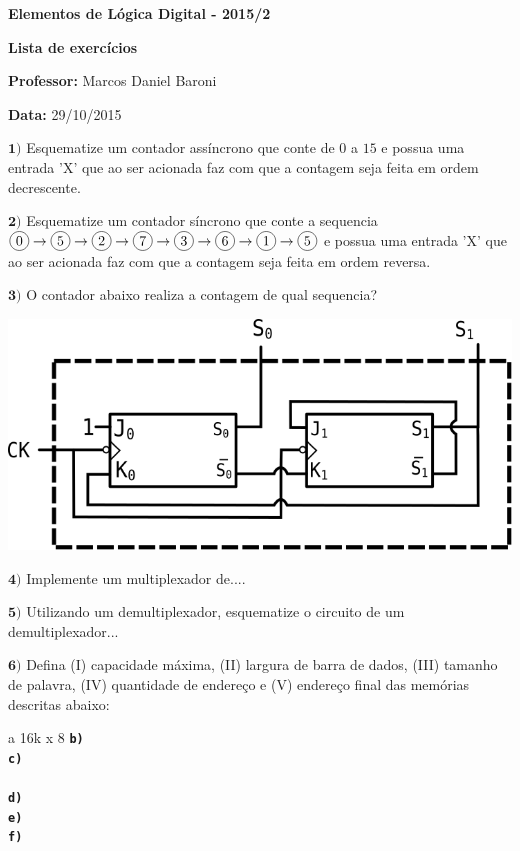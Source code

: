 \documentclass[12pt]{article}
\newcommand{\exerc}[3]{ \vspace*{25pt} {$\mathbf{#1)}$} #2 \hfill {\it #3} }
\newcommand{\exitem}[2]{ \texttt{\bf #1)} #2 \\ }
\newenvironment{exitems}[1]{
\\
\hspace*{30pt}
\begin{minipage}{0.8\textwidth}
\begin{multicols}{#1} 
}{
\end{multicols}
\end{minipage}
}
\newcommand*\circled[1]{\tikz[baseline=(char.base)]{
            \node[shape=circle,draw,inner sep=2pt] (char) {#1};}}
\begin{document}

\begin{center}
{\Large \bf Elementos de Lógica Digital - 2015/2}
\end{center}

{\large \bf Lista de exercícios}

{\bf Professor:} Marcos Daniel Baroni

{\bf Data:} 29/10/2015


\exerc{1}{Esquematize um contador assíncrono que conte de $0$ a $15$ e possua uma entrada 'X'
	que ao ser acionada faz com que a contagem seja feita em ordem decrescente.}{}

\exerc{2}{Esquematize um contador síncrono que conte a sequencia
	$\circled{0} \rightarrow
	\circled{5} \rightarrow
	\circled{2} \rightarrow
	\circled{7} \rightarrow
	\circled{3} \rightarrow
	\circled{6} \rightarrow
	\circled{1} \rightarrow \circled{5}$ e possua uma entrada 'X' que ao ser acionada faz com que a contagem
 	seja feita em ordem reversa.}{}

\exerc{3}{O contador abaixo realiza a contagem de qual sequencia?}{}
\begin{center}
		\includegraphics[scale=0.6]{cont1} \\ \vspace{15pt}
\end{center}

\exerc{4}{Implemente um multiplexador de....}{}

\exerc{5}{Utilizando um demultiplexador, esquematize o circuito de um demultiplexador...}{}

\exerc{6}{Defina (I) capacidade máxima, (II) largura de barra de dados, (III) tamanho de palavra,
(IV) quantidade de endereço e (V) endereço final das memórias descritas abaixo:}{}
\begin{exitems}{2}
	\exitem{a}{ 16k x 8}
	\exitem{b}{ }
	\exitem{c}{ }
	\\
	\exitem{d}{ }
	\exitem{e}{ }
	\exitem{f}{ }
\end{exitems}

\begin{multicols}{2}
\begin{center}
\end{center}
\end{multicols}
\end{document}

